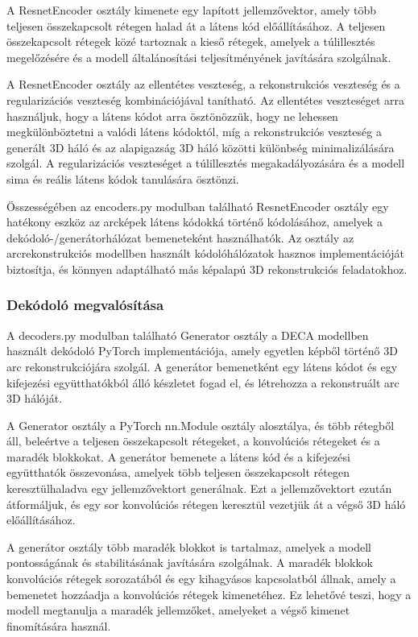 \documentclass[12pt,a4]{article}
\begin{document}
A ResnetEncoder osztály kimenete egy lapított jellemzővektor, amely több teljesen összekapcsolt rétegen halad át a látens kód előállításához. 
A teljesen összekapcsolt rétegek közé tartoznak a kieső rétegek, amelyek a túlillesztés megelőzésére és a modell általánosítási teljesítményének javítására szolgálnak.

A ResnetEncoder osztály az ellentétes veszteség, a rekonstrukciós veszteség és a regularizációs veszteség kombinációjával tanítható.
Az ellentétes veszteséget arra használjuk, hogy a látens kódot arra ösztönözzük, hogy ne lehessen megkülönböztetni a valódi látens kódoktól, 
 míg a rekonstrukciós veszteség a generált 3D háló és az alapigazság 3D háló közötti különbség minimalizálására szolgál.
 A regularizációs veszteséget a túlillesztés megakadályozására és a modell sima és reális látens kódok tanulására ösztönzi.

Összességében az encoders.py modulban található ResnetEncoder osztály egy hatékony eszköz az arcképek látens kódokká történő kódolásához, amelyek a dekódoló-/generátorhálózat bemeneteként használhatók. 
Az osztály az arcrekonstrukciós modellben használt kódolóhálózatok hasznos implementációját biztosítja, és könnyen adaptálható más képalapú 3D rekonstrukciós feladatokhoz.

 \subsubsection{Dekódoló megvalósítása}
 A decoders.py modulban található Generator osztály a DECA modellben használt dekódoló PyTorch implementációja, amely egyetlen képből történő 3D arc rekonstrukciójára szolgál.
 A generátor bemenetként egy látens kódot és egy kifejezési együtthatókból álló készletet fogad el, és létrehozza a rekonstruált arc 3D hálóját.
 
 A Generator osztály a PyTorch nn.Module osztály alosztálya, és több rétegből áll, beleértve a teljesen összekapcsolt rétegeket, a konvolúciós rétegeket és a maradék blokkokat. 
A generátor bemenete a látens kód és a kifejezési együtthatók összevonása, amelyek több teljesen összekapcsolt rétegen keresztülhaladva egy jellemzővektort generálnak. 
Ezt a jellemzővektort ezután átformáljuk, és egy sor konvolúciós rétegen keresztül vezetjük át a végső 3D háló előállításához.

A generátor osztály több maradék blokkot is tartalmaz, amelyek a modell pontosságának és stabilitásának javítására szolgálnak. 
A maradék blokkok konvolúciós rétegek sorozatából és egy kihagyásos kapcsolatból állnak, amely a bemenetet hozzáadja a konvolúciós rétegek kimenetéhez.
 Ez lehetővé teszi, hogy a modell megtanulja a maradék jellemzőket, amelyeket a végső kimenet finomítására használ.
 
\end{document}
